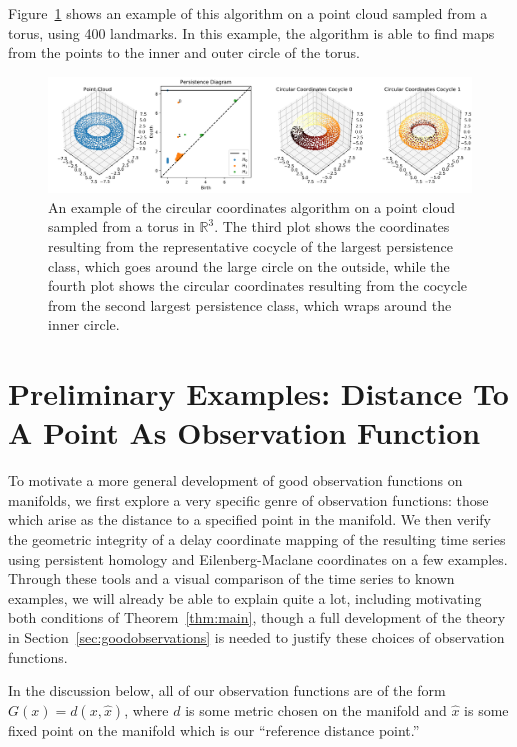 \documentclass[11pt]{article}
\theoremstyle{definition}
\theoremstyle{remark}
\begin{document}
    Figure~\ref{fig:CircularCoords} shows an example of this algorithm on a point cloud sampled from a torus, using 400 landmarks.  In this example, the algorithm is able to find maps from the points to the inner and outer circle of the torus.

    \begin{figure}[!htb]
        \centering
        \includegraphics[width=\textwidth]{CircularCoordinatesExample.png}
        \caption{An example of the circular coordinates algorithm on a point cloud sampled from a torus in $\mathbb{R}^3$.  The third plot shows the coordinates resulting from the representative cocycle of the largest persistence class, which goes around the large circle on the outside, while the fourth plot shows the circular coordinates resulting from the cocycle from the second largest persistence class, which wraps around the inner circle.}
        \label{fig:CircularCoords}
    \end{figure}







    \section{Preliminary Examples: Distance To A Point As Observation Function}
    \label{sec:distancesobs}
    To motivate a more general development of good observation functions on manifolds, we first explore a very specific genre of observation functions: 
    those which arise as the distance to a specified point in the manifold.  We then verify the geometric integrity of a delay coordinate mapping of the resulting time series using persistent homology and Eilenberg-Maclane coordinates on a few examples.  Through these tools and a visual comparison of the time series to known examples, we will already be able to explain quite a lot, including motivating both conditions of Theorem~\ref{thm:main}, though a full development of the theory in Section~\ref{sec:goodobservations} is needed to justify these choices of observation functions.
    
    In the discussion below, all of our observation functions are of the form $G(x) = d(x, \hat{x})$, where $d$ is some metric chosen on the manifold and $\hat{x}$ is some fixed point on the manifold which is our ``reference distance point.''
\end{document}
